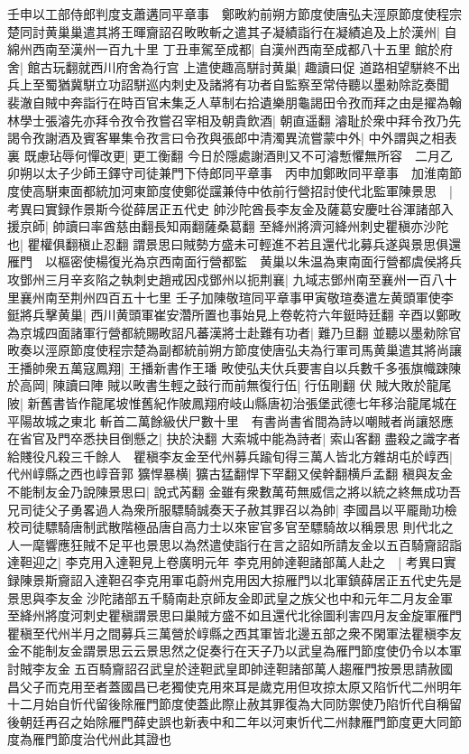壬申以工部侍郎判度支蕭遘同平章事　鄭畋約前朔方節度使唐弘夫涇原節度使程宗楚同討黄巢巢遣其將王暉齎詔召畋畋斬之遣其子凝績詣行在凝績追及上於漢州|{
	自綿州西南至漢州一百九十里}
丁丑車駕至成都|{
	自漢州西南至成都八十五里}
館於府舍|{
	館古玩翻就西川府舍為行宫}
上遣使趣高駢討黄巢|{
	趣讀曰促}
道路相望駢終不出兵上至蜀猶冀駢立功詔駢巡内刺史及諸將有功者自監察至常侍聽以墨勑除訖奏聞　裴澈自賊中奔詣行在時百官未集乏人草制右拾遺樂朋龜謁田令孜而拜之由是擢為翰林學士張濬先亦拜令孜令孜嘗召宰相及朝貴飲酒|{
	朝直遥翻}
濬耻於衆中拜令孜乃先謁令孜謝酒及賓客畢集令孜言曰令孜與張郎中清濁異流嘗蒙中外|{
	中外謂與之相表裏}
既慮玷辱何憚改更|{
	更工衡翻}
今日於隱處謝酒則又不可濬慙懼無所容　二月乙卯朔以太子少師王鐸守司徒兼門下侍郎同平章事　丙申加鄭畋同平章事　加淮南節度使高駢東面都統加河東節度使鄭從讜兼侍中依前行營招討使代北監軍陳景思　|{
	考異曰實録作景斯今從薛居正五代史}
帥沙陀酋長李友金及薩葛安慶吐谷渾諸部入援京師|{
	帥讀曰率酋慈由翻長知兩翻薩桑葛翻}
至絳州將濟河絳州刺史瞿稹亦沙陀也|{
	瞿權俱翻稹止忍翻}
謂景思曰賊勢方盛未可輕進不若且還代北募兵遂與景思俱還雁門　以樞密使楊復光為京西南面行營都監　黄巢以朱温為東南面行營都虞侯將兵攻鄧州三月辛亥陷之執刺史趙戒因戍鄧州以扼荆襄|{
	九域志鄧州南至襄州一百八十里襄州南至荆州四百五十七里}
壬子加陳敬瑄同平章事甲寅敬瑄奏遣左黄頭軍使李鋌將兵擊黄巢|{
	西川黄頭軍崔安濳所置也事始見上卷乾符六年鋌時廷翻}
辛酉以鄭畋為京城四面諸軍行營都統賜畋詔凡蕃漢將士赴難有功者|{
	難乃旦翻}
並聽以墨勑除官畋奏以涇原節度使程宗楚為副都統前朔方節度使唐弘夫為行軍司馬黄巢遣其將尚讓王播帥衆五萬寇鳳翔|{
	王播新書作王璠}
畋使弘夫㐲兵要害自以兵數千多張旗幟踈陳於高岡|{
	陳讀曰陣}
賊以畋書生輕之鼓行而前無復行伍|{
	行伍剛翻}
伏賊大敗於龍尾陂|{
	新舊書皆作龍尾坡惟舊紀作陂鳳翔府岐山縣唐初治張堡武德七年移治龍尾城在平陽故城之東北}
斬首二萬餘級伏尸數十里　有書尚書省間為詩以嘲賊者尚讓怒應在省官及門卒悉抉目倒懸之|{
	抉於決翻}
大索城中能為詩者|{
	索山客翻}
盡殺之識字者給賤役凡殺三千餘人　瞿稹李友金至代州募兵踰旬得三萬人皆北方雜胡屯於崞西|{
	代州崞縣之西也崞音郭}
獷悍暴横|{
	獷古猛翻悍下罕翻又侯幹翻横戶孟翻}
稹與友金不能制友金乃說陳景思曰|{
	說式芮翻}
金雖有衆數萬苟無威信之將以統之終無成功吾兄司徒父子勇畧過人為衆所服驃騎誠奏天子赦其罪召以為帥|{
	李國昌以平龎勛功檢校司徒驃騎唐制武散階極品唐自高力士以來宦官多官至驃騎故以稱景思}
則代北之人一麾響應狂賊不足平也景思以為然遣使詣行在言之詔如所請友金以五百騎齎詔詣達靼迎之|{
	李克用入達靼見上卷廣明元年}
李克用帥達靼諸部萬人赴之　|{
	考異曰實録陳景斯齎詔入達靼召李克用軍屯蔚州克用因大掠雁門以北軍鎮薛居正五代史先是景思與李友金沙陀諸部五千騎南赴京師友金即武皇之族父也中和元年二月友金軍至絳州將度河刺史瞿稹謂景思曰巢賊方盛不如且還代北徐圖利害四月友金旋軍雁門瞿稹至代州半月之間募兵三萬營於崞縣之西其軍皆北邊五部之衆不閑軍法瞿稹李友金不能制友金謂景思云云景思然之促奏行在天子乃以武皇為雁門節度使仍令以本軍討賊李友金五百騎齎詔召武皇於逹靼武皇即帥逹靼諸部萬人趨雁門按景思請赦國昌父子而克用至者蓋國昌已老獨使克用來耳是歲克用但攻掠太原又陷忻代二州明年十二月始自忻代留後除雁門節度使蓋此際止赦其罪復為大同防禦使乃陷忻代自稱留後朝廷再召之始除雁門薛史誤也新表中和二年以河東忻代二州隸雁門節度更大同節度為雁門節度治代州此其證也}
